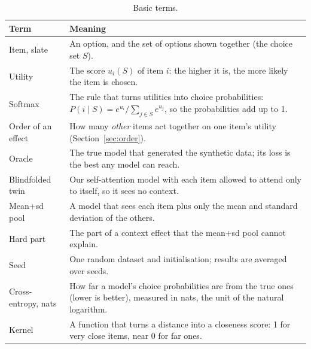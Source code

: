 \documentclass[11pt,a4paper]{article}
\numberwithin{table}{section}
\numberwithin{figure}{section}
\numberwithin{equation}{section}
\begin{document}
\begin{table}[h]
\centering\small
\caption{Basic terms.}\label{tab:terms}
\begin{tabularx}{\textwidth}{@{}lX@{}}
\toprule
\textbf{Term} & \textbf{Meaning}\\
\midrule
Item, slate & An option, and the set of options shown together (the choice set $S$).\\
Utility & The score $u_i(S)$ of item $i$: the higher it is, the more likely the item is chosen.\\
Softmax & The rule that turns utilities into choice probabilities: $P(i\mid S)=e^{u_i}/\sum_{j\in S}e^{u_j}$, so the probabilities add up to 1.\\
Order of an effect & How many \emph{other} items act together on one item's utility (Section~\ref{sec:order}).\\
Oracle & The true model that generated the synthetic data; its loss is the best any model can reach.\\
Blindfolded twin & Our self-attention model with each item allowed to attend only to itself, so it sees no context.\\
Mean+sd pool & A model that sees each item plus only the mean and standard deviation of the others.\\
Hard part & The part of a context effect that the mean+sd pool cannot explain.\\
Seed & One random dataset and initialisation; results are averaged over seeds.\\
Cross-entropy, nats & How far a model's choice probabilities are from the true ones (lower is better), measured in nats, the unit of the natural logarithm.\\
Kernel & A function that turns a distance into a closeness score: 1 for very close items, near 0 for far ones.\\
\bottomrule
\end{tabularx}
\end{table}
\end{document}
